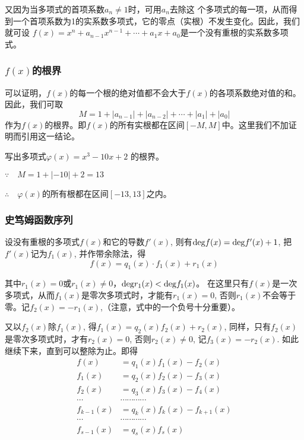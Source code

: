 又因为当多项式的首项系数$a_n\ne 1$时，可用$a_n$去除这
个多项式的每一项，从而得到一个首项系数为1的实系数多项式，它的零点（实根）不发生变化。因此，我们就可设
$f (x) =x^n+a_{n-1}x^{n-1}+\cdots +a_1x +a_0$是一个没有重根的实系数多项式。

\subsubsection{$f(x)$的根界}

可以证明，$f(x)$的每一个根的绝对值都不会大于$f(x)$的各项系数绝对值的和。因此，我们可取
\[M=1+|a_{n-1}|+|a_{n-2}|+\cdots+|a_1|+|a_0|\]
作为$f(x)$的根界。即$f(x)$的所有实根都在区间$[-M,M]$中。这里我们不加证明而引用这一结论。

\begin{example}
    写出多项式$\varphi(x)=x^3-10x+2$ 的根界。
\end{example}

\begin{solution}
 $\because\quad    M=1+|-10|+2=13$
 
 $\therefore\quad \varphi(x)$的所有根都在区间$[-13, 13]$之内。
\end{solution}

\subsubsection{史笃姆函数序列}
设没有重根的多项式$f(x)$和它的导数$f'(x)$, 则有${\rm deg}f(x)={\rm deg}f'(x)+1$, 把$f'(x)$记为$f_1(x)$, 并作带余除法，得
\[f (x) =q_1 (x)\cdot f_1(x)+r_1(x)\]

其中$r_1(x)=0$或$r_1(x)\ne 0$，${\rm deg}r_1(x)<{\rm deg}f_1(x)$。
在这里只有$f(x)$是一次多项式，从而$f_1(x)$是零次多项式时，才能有$r_1(x)=0$, 否则$r_1(x)$不会等于零。记$f_2(x)=-r_1(x)$,（注意，式中的一个负号十分重要）。

又以$f_2(x)$除$f_1(x)$, 得$f_1(x)=q_2(x)f_2(x)+r_2(x)$, 同样，只有$f_2(x)$是零次多项式时，才有$r_2(x)=0$, 否则$r_2(x)\ne 0$, 记$f_3(x)=-r_2(x)$. 如此继续下来，直到可以整除为止。即得
\[\begin{split}
    f(x)&=q_1(x)f_1(x)-f_2(x)\\
    f_1(x)&=q_2(x)f_2(x)-f_3(x)\\
    f_2(x)&=q_3(x)f_3(x)-f_4(x)\\
    \cdots &\cdots \cdots \cdots \cdots \\
    f_{k-1}(x)&=q_k(x)f_k(x)-f_{k+1}(x)\\
    \cdots &\cdots \cdots \cdots \cdots \\
    f_{s-1}(x)&=q_s(x)f_s(x)\\
\end{split}\]

